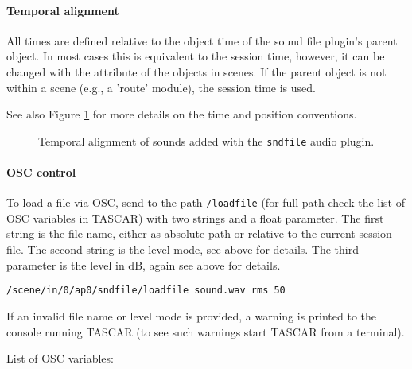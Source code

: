\paragraph{Temporal alignment}
%
All times are defined relative to the object time of the sound file plugin's parent object. In most cases this is equivalent to the session time, however, it can be changed with the  attribute of the objects in scenes. If the parent object is not within a scene (e.g., a 'route' module), the session time is used.

See also Figure \ref{fig:ap_sndfile} for more details on the time and position conventions.

\begin{figure}[htb]
    \centering
    \caption{Temporal alignment of sounds added with the {\tt sndfile} audio plugin.}
    \label{fig:ap_sndfile}
\end{figure}

\paragraph{OSC control}
%
To load a file via OSC, send to the path {\tt /loadfile} (for full
path check the list of OSC variables in TASCAR) with two strings and a
float parameter.
%
The first string is the file name, either as absolute path or relative
to the current session file. The second string is the level mode, see
above for details. The third parameter is the level in dB, again see
above for details.
%
\begin{verbatim}
/scene/in/0/ap0/sndfile/loadfile sound.wav rms 50
\end{verbatim}
%
If an invalid file name or level mode is provided, a warning is
printed to the console running TASCAR (to see such warnings start
TASCAR from a terminal).

List of OSC variables:


